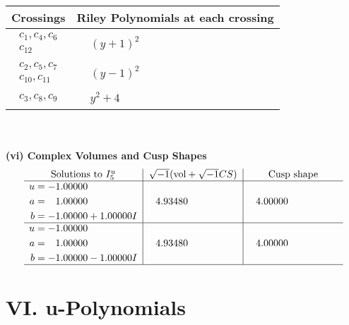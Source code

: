 \documentclass[1p]{elsarticle_modified}
\theoremstyle{definition}
\newcommand{\I}{\sqrt{-1}}
\begin{document}
\begin{tabular}{m{50pt}|m{274pt}}
Crossings & \hspace{64pt}Riley Polynomials at each crossing \\
\hline $$\begin{aligned}c_{1},c_{4},c_{6}\\c_{12}\end{aligned}$$&$\begin{aligned}
&(y+1)^2
\end{aligned}$\\
\hline $$\begin{aligned}c_{2},c_{5},c_{7}\\c_{10},c_{11}\end{aligned}$$&$\begin{aligned}
&(y-1)^2
\end{aligned}$\\
\hline $$\begin{aligned}c_{3},c_{8},c_{9}\end{aligned}$$&$\begin{aligned}
&y^2+4
\end{aligned}$\\
\hline
\end{tabular}\\~\\
\newpage\flushleft \textbf{(vi) Complex Volumes and Cusp Shapes}
$$\begin{array}{c|c|c}  
\text{Solutions to }I^u_{5}& \I (\text{vol} + \sqrt{-1}CS) & \text{Cusp shape}\\
 \hline 
\begin{aligned}
u &= -1.00000\phantom{ +0.000000I} \\
a &= \phantom{-}1.00000\phantom{ +0.000000I} \\
b &= -1.00000 + 1.00000 I\end{aligned}
 & \phantom{-}4.93480\phantom{ +0.000000I} & \phantom{-}4.00000\phantom{ +0.000000I} \\ \hline\begin{aligned}
u &= -1.00000\phantom{ +0.000000I} \\
a &= \phantom{-}1.00000\phantom{ +0.000000I} \\
b &= -1.00000 - 1.00000 I\end{aligned}
 & \phantom{-}4.93480\phantom{ +0.000000I} & \phantom{-}4.00000\phantom{ +0.000000I}\\
 \hline 
 \end{array}$$\newpage
\newpage\renewcommand{\arraystretch}{1}
\centering \section*{ VI. u-Polynomials}
\end{document}
